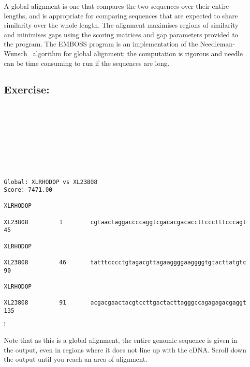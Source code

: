 \documentclass[12pt]{report}
\begin{document}
A global alignment is one that compares the two sequences over their
entire lengths, and is appropriate for comparing sequences that are
expected to share similarity over the whole length. The alignment
maximises regions of similarity and minimises gaps using the scoring
matrices and gap parameters provided to the program. The EMBOSS
program  is an implementation of the Needleman-Wunsch~\cite{Needle:70} algorithm for global alignment; the computation is rigorous and needle
can be time consuming to run if the sequences are long. 

\subsection*{Exercise: }

\unix{}\\
\\
\\
\\
\\
\\
\\

\unix{}
\begin{verbatim}
Global: XLRHODOP vs XL23808
Score: 7471.00

XLRHODOP                                                               
                                                                      
XL23808         1        cgtaactaggaccccaggtcgacacgacaccttccctttcccagt 45      

XLRHODOP                                                               
                                                                      
XL23808         46       tatttcccctgtagacgttagaaggggaaggggtgtacttatgtc 90      

XLRHODOP                                                               
                                                                      
XL23808         91       acgacgaactacgtccttgactacttagggccagagagacgaggt 135     
\end{verbatim}
$\vdots$
\\
\\
\noindent Note that as this is a global alignment, the entire genomic sequence
is given in the output, even in regions where it does not line up with
the cDNA. Scroll down the output until you reach an area of alignment.
\end{document}
